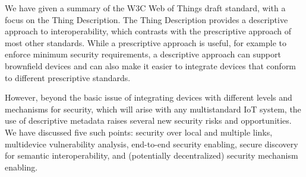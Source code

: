 We have given a summary of the W3C Web of Things draft
standard, with a focus on the Thing Description.
The Thing Description provides a descriptive approach to 
interoperability, which contrasts with the prescriptive
approach of most other standards.
While a prescriptive approach is useful, for example to
enforce minimum security requirements,
a descriptive approach can support brownfield devices
and can also make it easier to integrate devices that
conform to different prescriptive standards.

However, beyond the basic issue of integrating devices
with different levels and mechanisms for security,
which will arise with any multistandard IoT system,
the use of descriptive metadata raises several
new security risks and opportunities.  
We have discussed five such points: 
security over local and multiple links,
multidevice vulnerability analysis,
end-to-end security enabling,
secure discovery for semantic interoperability,
and (potentially decentralized) security mechanism enabling.
